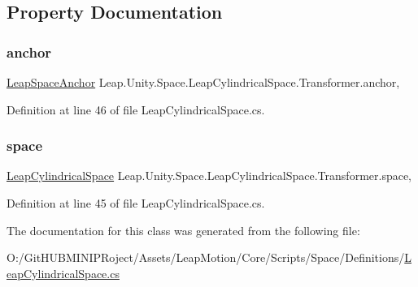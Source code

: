 \subsection{Property Documentation}
\mbox{\label{class_leap_1_1_unity_1_1_space_1_1_leap_cylindrical_space_1_1_transformer_a9b0c7e65513d10439dc35f983cb90a38}} 
\subsubsection{\texorpdfstring{anchor}{anchor}}
{\footnotesize\ttfamily \mbox{\hyperlink{class_leap_1_1_unity_1_1_space_1_1_leap_space_anchor}{Leap\+Space\+Anchor}} Leap.\+Unity.\+Space.\+Leap\+Cylindrical\+Space.\+Transformer.\+anchor\hspace{0.3cm}{\ttfamily [get]}, {\ttfamily [set]}}



Definition at line 46 of file Leap\+Cylindrical\+Space.\+cs.

\mbox{\label{class_leap_1_1_unity_1_1_space_1_1_leap_cylindrical_space_1_1_transformer_a06f1107a2386c409efa1e2b912974634}} 
\subsubsection{\texorpdfstring{space}{space}}
{\footnotesize\ttfamily \mbox{\hyperlink{class_leap_1_1_unity_1_1_space_1_1_leap_cylindrical_space}{Leap\+Cylindrical\+Space}} Leap.\+Unity.\+Space.\+Leap\+Cylindrical\+Space.\+Transformer.\+space\hspace{0.3cm}{\ttfamily [get]}, {\ttfamily [set]}}



Definition at line 45 of file Leap\+Cylindrical\+Space.\+cs.



The documentation for this class was generated from the following file\+:\begin{DoxyCompactItemize}
\item 
O\+:/\+Git\+H\+U\+B\+M\+I\+N\+I\+P\+Roject/\+Assets/\+Leap\+Motion/\+Core/\+Scripts/\+Space/\+Definitions/\mbox{\hyperlink{_leap_cylindrical_space_8cs}{Leap\+Cylindrical\+Space.\+cs}}\end{DoxyCompactItemize}
